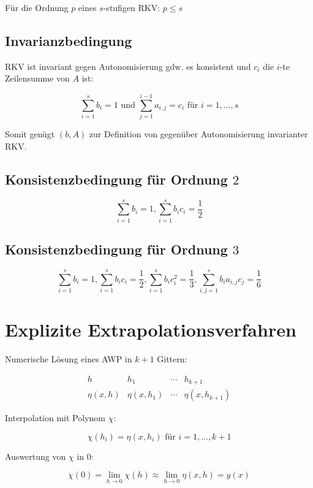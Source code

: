 Für die Ordnung $p$ eines $s$-stufigen RKV: $p \leq s$

\subsection*{Invarianzbedingung}

RKV ist invariant gegen Autonomisierung gdw. es konsistent und $c_i$ die $i$-te Zeilensumme von $A$ ist:

$$\sum_{i=1}^s b_i = 1 \text{ und } \sum_{j=1}^{i-1} a_{i,j} = c_i \text{ für } i=1,\dots,s$$

Somit genügt $(b, A)$ zur Definition von gegenüber Autonomisierung invarianter RKV.

\subsection*{Konsistenzbedingung für Ordnung $2$}

$$\sum_{i=1}^s b_i = 1 , \sum_{i=1}^s b_i c_i = \frac{1}{2}$$

\subsection*{Konsistenzbedingung für Ordnung $3$}

$$\sum_{i=1}^s b_i = 1 , \sum_{i=1}^s b_i c_i = \frac{1}{2} , \sum_{i=1}^s b_i c_i^2 = \frac{1}{3} , \sum_{i,j=1}^s b_i a_{i,j} c_j = \frac{1}{6}$$

\section*{Explizite Extrapolationsverfahren}

Numerische Lösung eines AWP in $k+1$ Gittern:

$$\begin{array}{c|ccc}
h & h_1 & \cdots & h_{k+1} \\
\hline
\eta(x,h) & \eta(x,h_1) & \cdots & \eta(x,h_{k+1})
\end{array}$$

Interpolation mit Polynom $\chi$:

\vspace*{-2mm}
$$\chi(h_i) = \eta(x,h_i) \text{ für } i=1,\dots,k+1$$

Auswertung von $\chi$ in $0$:

\vspace*{-2mm}
$$\chi(0) = \lim_{h \to 0} \chi(h) \approx \lim_{h \to 0} \eta(x,h) = y(x)$$

